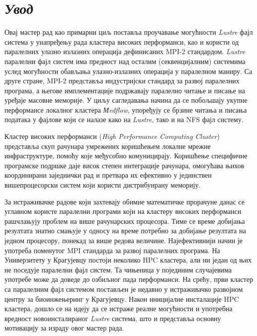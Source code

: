 \chapter{ \textit{Увод} }

Овај мастер рад као примарни циљ поставља проучавање могућности \textit{Lustre} фајл система у унапређењу рада кластера високих перформанси, као и користи од паралелних улазно излазних операција дефинисаних MPI-2 стандардом.
\textit{Lustre} паралелни фајл систем има предност над осталим (секвенцијалним) системима услед могућности обављања улазно-излазних операција у паралелном маниру. Са друге стране, MPI-2 представља индустријски стандард за развој паралелних програма, а његове имплементације подржавају паралелно читање и писање на уређаје масовне меморије. У циљу сагледавања начина да се побољшају укупне перформансе локалног кластера \textit{Мedflow}, упоређују се брзине читања и писања података у фајлове који се налазе како на \textit{Lustre}, тако и на NFS  фајл систему.

Кластер високих перформанси (\textit{High Performance Computing Cluster}) представља скуп рачунара умрежених коришћењем локалне мрежне инфраструктуре, помоћу које међусобно комуницирају. Коришћење специфичне програмске подршке даје висок степен интеграције рачунара, омогућава њихов координирани заједнички рад и претвара их ефективно у јединствен вишепроцесорски систем који користи дистрибуирану меморију.

За истраживачке радове који захтевају обимне математичке прорачуне данас се углавном користе паралелни програми који на кластеру високих перформанси рашчлањују проблем на више рачунарских процесора. Тиме се време добијања резултата знатно смањује у односу на време потребно за добијање резултата на једном процесору, понекад за више редова величине. Најефективнији начин је употреба поменутог MPI стандарда за развој паралелних програма. На Универзитету у Крагујевцу постоји неколико HPC кластера, али ни један од њих не поседује паралелни фајл систем. Та чињеница у појединим случајевима употребе може да доведе до озбиљног пада перформанси. На срећу, први кластер са паралелним фајл системом постављен је недавно у истраживачко развојном центру за биоинжењеринг у Крагујевцу. Након иницијалне инсталације HPC кластера, дошло се на идеју да се истраже реалне могућности и употребна вредност новоинсталираног \textit{Lustre} система, што и представља основну мотивацију за израду овог мастер рада.
 

